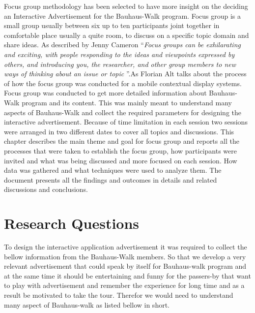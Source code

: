 Focus group methodology has been selected to have more insight on the deciding an Interactive Advertisement for the Bauhaus-Walk program. Focus group is a small group usually between six up to ten participants joint together in comfortable place usually a quite room, to discuss on a specific topic domain and share ideas. As described by Jenny Cameron ``\emph{Focus groups can be exhilarating and exciting, with people responding to the ideas and viewpoints expressed by others, and introducing you, the researcher, and other group members to new ways of thinking about an issue or topic }''\cite{FocusGroup}.As Florian Alt \cite{mobile_focus_group}talks about the process of how the focus group was conducted for a mobile contextual display systems. \\

Focus group was conducted to get more detailed information about Bauhaus-Walk program and its content. This was mainly meant to understand many aspects of Bauhaus-Walk and collect the required parameters for designing the interactive advertisement. Because of time limitation in each session two sessions were arranged in two different dates to cover all topics and discussions. This chapter describes the main theme and goal for focus group and reports all the processes that were taken to establish the focus group, how participants were invited and what was being discussed and more focused on each session. How data was gathered and what techniques were used to analyze them. The document presents all the findings and outcomes in details and related discussions and conclusions.\\

\section{Research Questions}
To design the interactive application advertisement it was required to collect the bellow information from the Bauhaus-Walk members. So that we develop a very relevant advertisement that could speak by itself for Bauhaus-walk program and at the same time it should be entertaining and funny for the passers-by that want to play with advertisement and remember the experience for long time and as a result be motivated to take the tour. Therefor we would need to understand many aspect of Bauhaus-walk as listed bellow in short.

